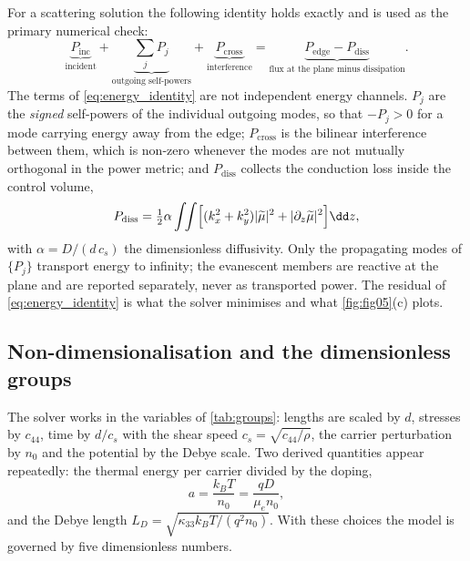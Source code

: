 For a scattering solution the following identity holds exactly and is used as
the primary numerical check:
\begin{equation}
\label{eq:energy_identity}
\underbrace{P_{\text{inc}}}_{\text{incident}}
+\underbrace{\sum_{j}P_j}_{\text{outgoing self-powers}}
+\underbrace{P_{\text{cross}}}_{\text{interference}}
=\underbrace{P_{\text{edge}}-P_{\text{diss}}}_{\text{flux at the plane minus dissipation}} .
\end{equation}
The terms of \eqref{eq:energy_identity} are not independent energy channels.
$P_j$ are the \emph{signed} self-powers of the individual outgoing modes, so
that $-P_j>0$ for a mode carrying energy away from the edge; $P_{\text{cross}}$
is the bilinear interference between them, which is non-zero whenever the
modes are not mutually orthogonal in the power metric; and $P_{\text{diss}}$
collects the conduction loss inside the control volume,
\begin{equation}
\label{eq:dissipation}
P_{\text{diss}}=\tfrac12\alpha\int\!\!\int
\Bigl[(k_x^2+k_y^2)|\widetilde\mu|^2+|\partial_z\widetilde\mu|^2\Bigr]\dd z ,
\end{equation}
with $\alpha=D/(d\,c_s)$ the dimensionless diffusivity.  Only the propagating
modes of $\{P_j\}$ transport energy to infinity; the evanescent members are
reactive at the plane and are reported separately, never as transported power.
The residual of \eqref{eq:energy_identity} is what the solver minimises and
what \cref{fig:fig05}(c) plots.

\subsection{Non-dimensionalisation and the dimensionless groups}
\label{sec:governing_nondim}

The solver works in the variables of \cref{tab:groups}: lengths are scaled by
$d$, stresses by $c_{44}$, time by $d/c_s$ with the shear speed
$c_s=\sqrt{c_{44}/\rho}$, the carrier perturbation by $n_0$ and the potential by
the Debye scale.  Two derived quantities appear repeatedly: the thermal energy
per carrier divided by the doping,
\begin{equation}
\label{eq:a_scale}
a=\frac{k_BT}{n_0}=\frac{qD}{\mu_e n_0},
\end{equation}
and the Debye length $L_D=\sqrt{\kappa_{33}k_BT/(q^2n_0)}$.  With these
choices the model is governed by five dimensionless numbers.


